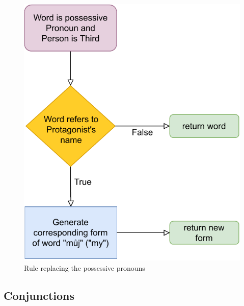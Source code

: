 \begin{figure}[!htbp]
\includegraphics[]{data/Erich-Posspron-Rule.pdf}
\caption{Rule replacing the possessive pronouns}
\label{fig:erich-posspron-rule}
\end{figure}


\subsection{Conjunctions}



